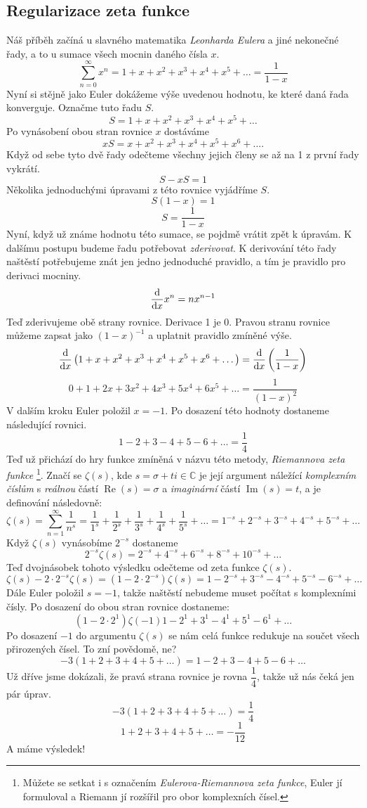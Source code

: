 \documentclass{../../../../style/mkimain}
\begin{document}
\subsection*{Regularizace zeta funkce}
Náš příběh začíná u slavného matematika \emph{Leonharda Eulera} a jiné nekonečné řady, a to u sumace všech mocnin daného čísla $x$.
$$
\sum_{n=0}^{\infty}x^n=1+x+x^2+x^3+x^4+x^5+\dots=\frac{1}{1-x}
$$
Nyní si stějně jako Euler dokážeme výše uvedenou hodnotu, ke které daná řada konverguje. Označme tuto řadu $S$.
$$
S=1+x+x^2+x^3+x^4+x^5+\dots
$$
Po vynásobení obou stran rovnice $x$ dostáváme 
$$
xS=x+x^2+x^3+x^4+x^5+x^6+\dots\text{.}
$$
Když od sebe tyto dvě řady odečteme všechny jejich členy se až na 1 z první řady vykrátí.
$$
S-xS=1
$$
Několika jednoduchými úpravami z této rovnice vyjádříme $S$.
$$
S(1-x)=1
$$
$$
S=\frac{1}{1-x}
$$
Nyní, když už známe hodnotu této sumace, se pojdmě vrátit zpět k úpravám. 
K dalšímu postupu budeme řadu potřebovat \emph{zderivovat}. K derivování 
této řady naštěstí potřebujeme znát jen jedno jednoduché pravidlo, a tím je pravidlo pro derivaci mocniny.
$$
\dv{x}x^n=nx^{n-1}
$$
Teď zderivujeme obě strany rovnice. Derivace 1 je 0. Pravou stranu rovnice můžeme zapsat 
jako $\left(1-x\right)^{-1}$ a uplatnit pravidlo zmíněné výše.
$$
\dv{x}\left(1+x+x^2+x^3+x^4+x^5+x^6+\dots\right)=\dv{x}\left(\frac{1}{1-x}\right)
$$
$$
0+1+2x+3x^2+4x^3+5x^4+6x^5+\dots=\frac{1}{\left(1-x\right)^2}
$$
V dalším kroku Euler položil $x=-1$. Po dosazení této hodnoty dostaneme následující rovnici.
$$
1-2+3-4+5-6+\dots=\frac{1}{4}
$$
Teď už přichází do hry funkce zmíněná v názvu této metody, \emph{Riemannova zeta funkce}
\footnote{Můžete se setkat i s označením \emph{Eulerova-Riemannova zeta funkce}, Euler jí formuloval a Riemann jí rozšířil pro obor komplexních čísel.}.
Značí se $\zeta(s)$, kde $s=\sigma+ti \in \mathbb{C}$ je její argument náležící \emph{komplexním číslům} s \emph{reálnou} částí $\operatorname{Re}(s)=\sigma$ 
a \emph{imaginární} částí $\operatorname{Im}(s)=t$, a je definování následovně:
$$
\zeta(s)=\sum_{n=1}^{\infty}\frac{1}{n^s}=\frac{1}{1^s}+\frac{1}{2^s}+\frac{1}{3^s}+\frac{1}{4^s}+\frac{1}{5^s}+\dots=1^{-s}+2^{-s}+3^{-s}+4^{-s}+5^{-s}+\dots
$$
Když $\zeta(s)$ vynásobíme $2^{-s}$ dostaneme
$$
2^{-s}\zeta(s)=2^{-s}+4^{-s}+6^{-s}+8^{-s}+10^{-s}+\dots
$$
Teď dvojnásobek tohoto výsledku odečteme od zeta funkce $\zeta(s)$.
$$
\zeta(s)-2\cdot2^{-s}\zeta(s)=(1-2\cdot2^{-s})\zeta(s)=1-2^{-s}+3^{-s}-4^{-s}+5^{-s}-6^{-s}+\dots
$$
Dále Euler položil $s=-1$, takže naštěstí nebudeme muset počítat s komplexními čísly. Po dosazení do obou stran rovnice dostaneme:
$$
(1-2\cdot2^1)\zeta(-1)1-2^{1}+3^{1}-4^{1}+5^{1}-6^{1}+\dots
$$
Po dosazení $-1$ do argumentu $\zeta(s)$ se nám celá funkce redukuje na součet všech přirozených čísel. To zní povědomě, ne?
$$
-3(1+2+3+4+5+\dots)=1-2+3-4+5-6+\dots
$$
Už dříve jsme dokázali, že pravá strana rovnice je rovna $\dfrac{1}{4}$, takže už nás čeká jen pár úprav.
$$
-3(1+2+3+4+5+\dots)=\frac{1}{4}
$$
$$
1+2+3+4+5+\dots=-\frac{1}{12}
$$
A máme výsledek!
\end{document}

